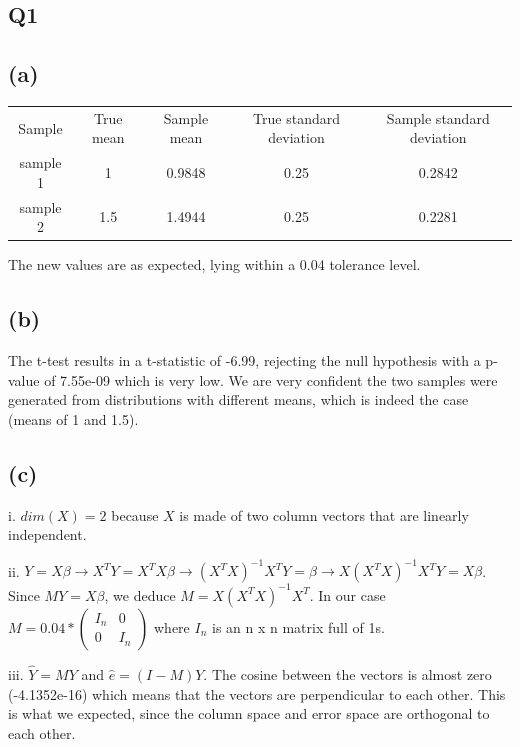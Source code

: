 \documentclass[11pt,a4paper,oneside]{report}
\begin{document}

\subsection*{Q1}
\subsection*{(a)}

\begin{center}
\begin{tabular}{c | c | c | c | c}
Sample & True mean & Sample mean & True standard deviation & Sample standard deviation\\
sample 1 & 1 & 0.9848 & 0.25 & 0.2842\\
sample 2 & 1.5 & 1.4944 & 0.25 & 0.2281\\
\end{tabular}
\end{center}

The new values are as expected, lying within a 0.04 tolerance level.

\subsection*{(b)}

The t-test results in a t-statistic of -6.99, rejecting the null hypothesis with a p-value of 7.55e-09 which is very low. We are very confident the two samples were generated from distributions with different means, which is indeed the case (means of 1 and 1.5).

\subsection*{(c)}

i. $dim(X) = 2$ because $X$ is made of two column vectors that are linearly independent.

ii. $Y = X\beta \to X^TY = X^TX\beta \to (X^TX)^{-1}X^TY = \beta \to X(X^TX)^{-1}X^TY = X\beta$. Since $MY = X\beta$, we deduce $M = X(X^TX)^{-1}X^T$. In our case $M = 
0.04 * \begin{pmatrix}
I_n & 0\\
0 & I_n
\end{pmatrix}
$
where $I_n$ is an n x n matrix full of 1s.
                 
                 
iii. $\hat{Y} = MY $ and $\hat{e} = (I-M)Y $. The cosine between the vectors is almost zero (-4.1352e-16) which means that the vectors are perpendicular to each other. This is what we expected, since the column space and error space are orthogonal to each other.
\end{document}
